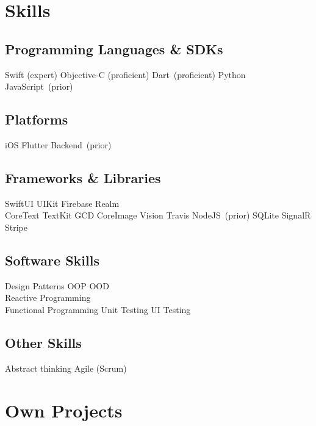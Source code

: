 \documentclass[]{deedy-resume-openfont}
\begin{document}
\begin{minipage}[t]{0.33\textwidth} 


\section{Skills}
\subsection{Programming Languages \& SDKs}
Swift (expert) \textbullet{} Objective-C (proficient) \textbullet{} Dart\ (proficient) \textbullet{} Python \textbullet{} JavaScript\ (prior)
\sectionsep
\subsection{Platforms}
iOS \textbullet{} Flutter \textbullet{} Backend\ (prior)
\sectionsep
\subsection{Frameworks \& Libraries}
SwiftUI \textbullet{} UIKit \textbullet{} Firebase \textbullet{} Realm \textbullet{} \\CoreText \textbullet{} TextKit \textbullet{} GCD \textbullet{} CoreImage \textbullet{} Vision \textbullet{} Travis \textbullet{} NodeJS\ (prior) \textbullet{} SQLite \textbullet{} SignalR \textbullet{} Stripe
\sectionsep
\subsection{Software Skills}
Design Patterns \textbullet{} OOP \textbullet{} OOD \textbullet{}\\ Reactive Programming \textbullet{} \\ Functional Programming \textbullet{} Unit Testing \textbullet{} UI Testing
\sectionsep
\subsection{Other Skills}
Abstract thinking \textbullet{} Agile (Scrum)
\sectionsep



\section{Own Projects}

\end{minipage}
\end{document}
